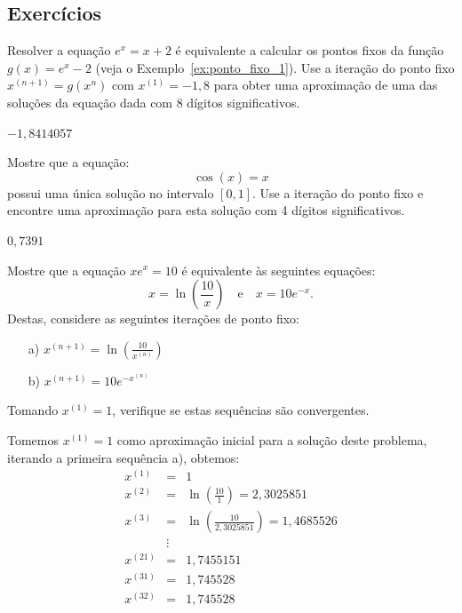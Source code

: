 \begin{ex}
\subsection*{Exercícios}

\begin{exer}
  Resolver a equação $e^x = x + 2$ é equivalente a calcular os pontos fixos da função $g(x) = e^x - 2$ (veja o Exemplo~\ref{ex:ponto_fixo_1}). Use a iteração do ponto fixo $x^{(n+1)} = g(x^{n})$ com $x^{(1)} = -1,8$ para obter uma aproximação de uma das soluções da equação dada com $8$ dígitos significativos.
\end{exer}
\begin{resp}
    $-1,8414057$
\end{resp}

\begin{exer}  Mostre que a equação:
  \begin{equation}
    \cos(x)=x
  \end{equation}
possui uma única solução no intervalo $[0, 1]$. Use a iteração do ponto fixo e encontre uma aproximação para esta solução com  4 dígitos significativos.
\end{exer}
\begin{resp}

    $0,7391$

\end{resp}

\begin{exer}
  Mostre que a equação $xe^x = 10$ é equivalente às seguintes equações:
\begin{equation}
  x=\ln\left(\frac{10}{x}\right)\quad\text{e}\quad x=10e^{-x}.
\end{equation}
Destas, considere as seguintes iterações de ponto fixo:
\begin{enumerate}
 \item [a)] $\displaystyle x^{(n+1)}=\ln \left(\frac{10}{x^{(n)}}\right)$
 \item [b)] $\displaystyle x^{(n+1)}=10 e^{-x^{(n)}} $
\end{enumerate}
Tomando $x^{(1)} = 1$, verifique se estas sequências são convergentes.
\end{exer}
\begin{resp}

Tomemos $x^{(1)}=1$ como aproximação inicial para a solução deste problema, iterando a primeira sequência a), obtemos:
\begin{eqnarray}
x^{(1)} &=& 1\\
x^{(2)} &=& \ln\left(\frac{10}{1}\right)=2,3025851\\
x^{(3)} &=& \ln\left(\frac{10}{2,3025851}\right)=1,4685526\\
        &\vdots&\\
x^{(21)}&=& 1,7455151\\
x^{(31)}&=& 1,745528\\
x^{(32)}&=& 1,745528
\end{eqnarray}


\end{resp}
\end{ex}
